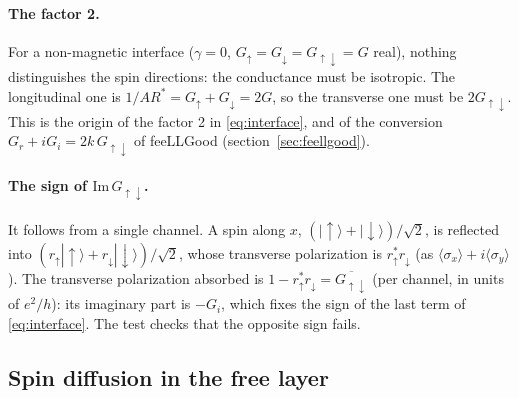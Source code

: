 \documentclass[11pt,a4paper]{article}
\begin{document}
\paragraph{The factor 2.} For a non-magnetic interface ($\gamma = 0$,
$G_\uparrow = G_\downarrow = G_{\uparrow\downarrow} = G$ real), nothing
distinguishes the spin directions: the conductance must be isotropic. The
longitudinal one is $1/AR^* = G_\uparrow+G_\downarrow = 2G$, so the
transverse one must be $2G_{\uparrow\downarrow}$. This is the origin of
the factor 2 in \eqref{eq:interface}, and of the conversion
$G_r + iG_i = 2k\,G_{\uparrow\downarrow}$ of feeLLGood
(section~\ref{sec:feellgood}).

\paragraph{The sign of $\mathrm{Im}\,G_{\uparrow\downarrow}$.} It follows
from a single channel. A spin along $x$, $(|{\uparrow}\rangle +
|{\downarrow}\rangle)/\sqrt2$, is reflected into $(r_\uparrow|{\uparrow}\rangle
+ r_\downarrow|{\downarrow}\rangle)/\sqrt2$, whose transverse polarization is
$r_\uparrow^*r_\downarrow$ (as $\langle\sigma_x\rangle + i\langle\sigma_y
\rangle$). The transverse polarization absorbed is $1 - r_\uparrow^*
r_\downarrow = \overline{G_{\uparrow\downarrow}}$ (per channel, in units of
$e^2/h$): its imaginary part is $-G_i$, which fixes the sign of the last
term of \eqref{eq:interface}. The test checks that the opposite sign fails.

\subsection{Spin diffusion in the free layer}
\end{document}
